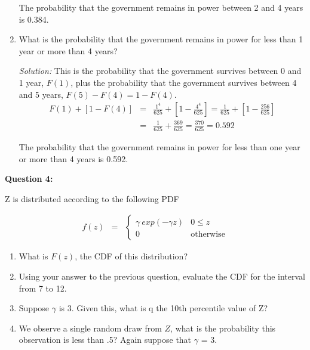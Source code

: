 \documentclass[11pt]{article}
\begin{document}
\begin{enumerate}
The probability that the government remains in power between 2 and 4 years is 0.384.

\medskip

\item What is the probability that the government remains in power for less than 1 year or more than 4 years?

{\it Solution:}
This is the probability that the government survives between 0 and 1 year, $F(1)$, plus the probability that the government survives between 4 and 5 years, $F(5)-F(4)=1-F(4)$.
\begin{eqnarray*}
F(1) + [1-F(4)] &=& \frac{1^4}{625} + \left[ 1 - \frac{4^4}{625} \right] = \frac{1}{625} + \left[ 1 - \frac{256}{625} \right] \\
&=& \frac{1}{625} + \frac{369}{625} = \frac{370}{625} = 0.592
\end{eqnarray*}

The probability that the government remains in power for less than one year or more than 4 years is 0.592.

\end{enumerate}

\noindent \textbf{Question 4:} 

Z is distributed according to the following PDF

\begin{eqnarray*}
f(z) &=& \begin{cases}
\gamma \ exp(-\gamma z) &  0 \le z \\
0 & \text{otherwise}
\end{cases}
\end{eqnarray*}

\begin{enumerate}
\item What is $F(z)$, the CDF of this distribution?
\item Using your answer to the previous question, evaluate the CDF for the interval from 7 to 12. 
\item Suppose $\gamma$ is 3. Given this, what is q the 10th percentile value of Z? 
\item We observe a single random draw from $Z$, what is the probability this observation is less than .5? Again suppose that $\gamma$ = 3. 
\end{enumerate}
\end{document}
